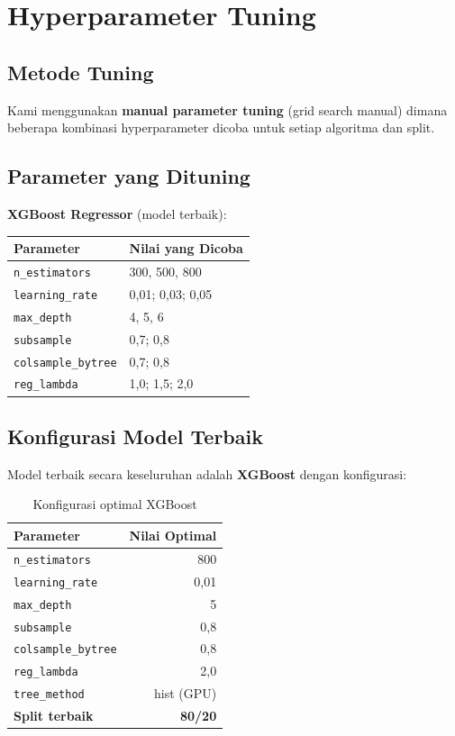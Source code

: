 \documentclass[12pt,a4paper]{article}
\begin{document}
\section{Hyperparameter Tuning}

\subsection{Metode Tuning}
Kami menggunakan \textbf{manual parameter tuning} (grid search manual) dimana beberapa kombinasi hyperparameter dicoba untuk setiap algoritma dan split.

\subsection{Parameter yang Dituning}

\textbf{XGBoost Regressor} (model terbaik):
\begin{table}[h!]
\centering
\begin{tabular}{ll}
\toprule
\textbf{Parameter} & \textbf{Nilai yang Dicoba} \\
\midrule
\texttt{n\_estimators}    & 300, 500, 800 \\
\texttt{learning\_rate}   & 0,01; 0,03; 0,05 \\
\texttt{max\_depth}       & 4, 5, 6 \\
\texttt{subsample}        & 0,7; 0,8 \\
\texttt{colsample\_bytree} & 0,7; 0,8 \\
\texttt{reg\_lambda}      & 1,0; 1,5; 2,0 \\
\bottomrule
\end{tabular}
\end{table}

\subsection{Konfigurasi Model Terbaik}
Model terbaik secara keseluruhan adalah \textbf{XGBoost} dengan konfigurasi:

\begin{table}[h!]
\centering
\caption{Konfigurasi optimal XGBoost}
\begin{tabular}{lr}
\toprule
\textbf{Parameter} & \textbf{Nilai Optimal} \\
\midrule
\texttt{n\_estimators}    & 800 \\
\texttt{learning\_rate}   & 0,01 \\
\texttt{max\_depth}       & 5 \\
\texttt{subsample}        & 0,8 \\
\texttt{colsample\_bytree} & 0,8 \\
\texttt{reg\_lambda}      & 2,0 \\
\texttt{tree\_method}     & hist (GPU) \\
\textbf{Split terbaik}    & \textbf{80/20} \\
\bottomrule
\end{tabular}
\end{table}
\end{document}
